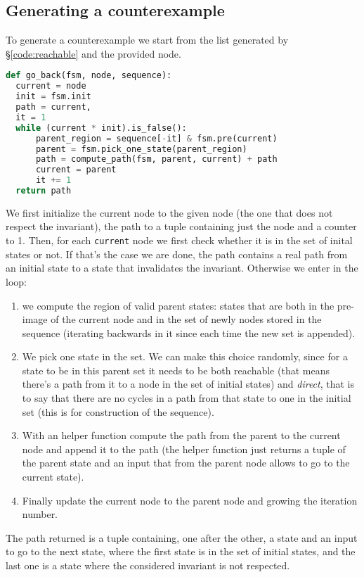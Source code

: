 \documentclass[9pt,oneside]{amsart}
\begin{document}
\begin{multicols}{2}
\section{Generating a counterexample}\label{back}
To generate a counterexample we start from the list generated by
\S\ref{code:reachable} and the provided node.
\begin{lstlisting}[language=Python]
def go_back(fsm, node, sequence):
  current = node
  init = fsm.init
  path = current,
  it = 1
  while (current * init).is_false():
      parent_region = sequence[-it] & fsm.pre(current)
      parent = fsm.pick_one_state(parent_region)
      path = compute_path(fsm, parent, current) + path
      current = parent
      it += 1
  return path
\end{lstlisting}
We first initialize the current node to the given node (the one that
does not respect the invariant), the path to a tuple containing just
the node and a counter to 1. Then, for each \texttt{current} node we
first check whether it is in the set of inital states or not. If
that's the case we are done, the path contains a real path from an
initial state to a state that invalidates the invariant. Otherwise we
enter in the loop:
\begin{enumerate}
\item we compute the region of valid parent states: states that are
  both in the pre-image of the current node and in the set of newly
  nodes stored in the sequence (iterating backwards in it since each
  time the new set is appended).
\item We pick one state in the set. We can make this choice randomly,
  since for a state to be in this parent set it needs to be both
  reachable (that means there's a path from it to a node in the set of
  initial states) and \textit{direct}, that is to say that there are
  no cycles in a path from that state to one in the initial set (this
  is for construction of the sequence).
\item With an helper function compute the path from the parent to the
  current node and append it to the path (the helper function just
  returns a tuple of the parent state and an input that from the
  parent node allows to go to the current state).
\item Finally update the current node to the parent node and growing
  the iteration number.
\end{enumerate}
The path returned is a tuple containing, one after the other, a state
and an input to go to the next state, where the first state is in the
set of initial states, and the last one is a state where the
considered invariant is not respected.
\end{multicols}
\end{document}
